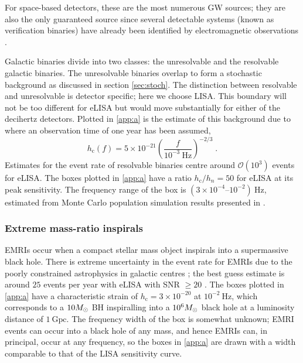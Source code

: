 For space-based detectors, these are the most numerous GW sources; they are also the only guaranteed source since several detectable systems (known as verification binaries) have already been identified by electromagnetic observations \citep{2006CQGra..23S.809S}.

Galactic binaries divide into two classes: the unresolvable and the resolvable galactic binaries. The unresolvable binaries overlap to form a stochastic background as discussed in section \ref{sec:stoch}. The distinction between resolvable and unresolvable is detector specific; here we choose LISA. This boundary will not be too different for eLISA but would move substantially for either of the decihertz detectors. Plotted in \ref{app:a} is the estimate of this background due to \citet{Nelemans} where an observation time of one year has been assumed,
\begin{equation}
h_\mathrm{c}(f)= 5\times 10^{-21} \left(\frac{f}{10^{-3}~\mathrm{Hz}}\right)^{-2/3} \; .
 \end{equation}
Estimates for the event rate of resolvable binaries centre around ${\mathcal{O}}(10^{3})$ events for eLISA. The boxes plotted in \ref{app:a} have a ratio $h_\mathrm{c}/h_{n}=50$ for eLISA at its peak sensitivity. The frequency range of the box is $\left(3\times10^{-4}\right.$--$\left.10^{-2}\right)~\mathrm{Hz}$, estimated from Monte Carlo population simulation results presented in \citet{Amaro-Seoane-et-al}.

\subsubsection{Extreme mass-ratio inspirals}

EMRIs occur when a compact stellar mass object inspirals into a supermassive black hole. There is extreme uncertainty in the event rate for EMRIs due to the poorly constrained astrophysics in galactic centres \citep[e.g.,][]{Merritt2011}; the best guess estimate is around $25$ events per year with eLISA with SNR $\ge 20$ \citep{TheGravitationalUniverse}. The boxes plotted in \ref{app:a} have a characteristic strain of $h_\mathrm{c}=3\times 10^{-20}$ at $10^{-2}~\mathrm{Hz}$, which corresponds to a $10M_{ \odot }$ BH inspiralling into a $10^{6}M_{ \odot }$ black hole at a luminosity distance of $1~\mathrm{Gpc}$. The frequency width of the box is somewhat unknown; EMRI events can occur into a black hole of any mass, and hence EMRIs can, in principal, occur at any frequency, so the boxes in \ref{app:a} are drawn with a width comparable to that of the LISA sensitivity curve.




